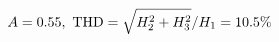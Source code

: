 \documentclass[preview]{standalone}
\begin{document}
\begin{align*}
\special{dvisvgm:raw <g id='unique000'>}A=0.55,\ \text{THD}=\sqrt{H_2^2+H_3^2}/H_1=10.5\%\special{dvisvgm:raw </g>}
\end{align*}
\end{document}
